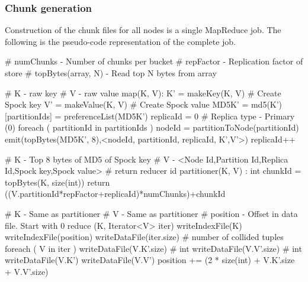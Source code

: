 \documentclass[10pt,twocolumn,preprint,nonatbib,numbers]{sigplanconf}
\begin{document}

\subsubsection{Chunk generation}
\label{sec:read_only:chunk_generation}

Construction of the chunk files for all \projectname{} nodes is a single MapReduce job. The following is the pseudo-code representation of the complete job. 

\scriptsize
\label{MapReduce for Chunk generation}
\begin{verbatimtab}
# numChunks - Number of chunks per bucket
# repFactor - Replication factor of store
# topBytes(array, N) - Read top N bytes from array

# K - raw key
# V - raw value
map(K, V):
  K' = makeKey(K, V)     	# Create Spock key
  V' = makeValue(K, V)   	# Create Spock value
  MD5K' = md5(K')
  [partitionIds] = preferenceList(MD5K')
  replicaId = 0			# Replica type - Primary (0)
  foreach ( partitionId in partitionIds )
    nodeId = partitionToNode(partitionId)
    emit(topBytes(MD5K', 8),<nodeId, partitionId, replicaId, K',V'>) 
    replicaId++     

# K - Top 8 bytes of MD5 of Spock key
# V - <Node Id,Partition Id,Replica Id,Spock key,Spock value>
# return reducer id
partitioner(K, V) : int
  chunkId = topBytes(K, size(int)) %
  return ((V.partitionId*repFactor+replicaId)*numChunks)+chunkId
 
# K - Same as partitioner
# V - Same as partitioner
# position - Offset in data file. Start with 0
reduce (K, Iterator<V> iter)
  writeIndexFile(K)
  writeIndexFile(position)
  writeDataFile(iter.size)   # number of collided tuples
  foreach ( V in iter )
    writeDataFile(V.K'.size) # int
    writeDataFile(V.V'.size) # int
    writeDataFile(V.K')
    writeDataFile(V.V')
    position += (2 * size(int) + V.K'.size + V.V'.size)
\end{verbatimtab}
\normalsize
\end{document}

